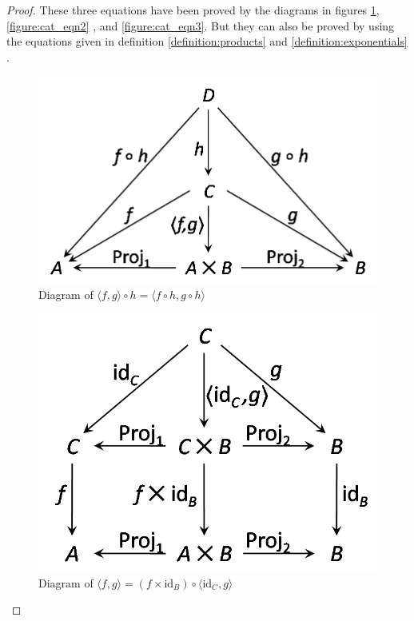 \begin{proof}
These three equations have been proved by the diagrams in figures \ref{figure:cat_eqn1}, \ref{figure:cat_eqn2} , and \ref{figure:cat_eqn3}. But they can also be proved by using the equations given in definition \ref{definition:products} and \ref{definition:exponentials} .

\begin{figure}[h!]
\centering
\includegraphics[scale=0.42]{./images/cat_eqn1}
\caption{Diagram of $ \langle f,g \rangle \circ h = \langle f \circ h , g \circ h \rangle $}
\label{figure:cat_eqn1}
\end{figure}
\begin{figure}[h!]
\centering
\includegraphics[scale=0.42]{./images/cat_eqn2}
\caption{Diagram of $ \langle f,g \rangle = ( f \times \text{id}_B ) \circ \langle \text{id}_C , g \rangle $}

\end{figure}
\end{proof}
